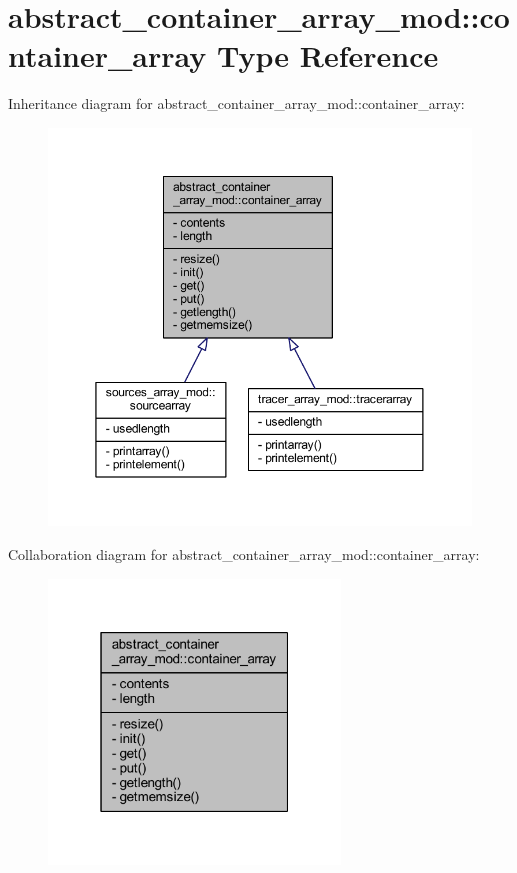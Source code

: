 \hypertarget{structabstract__container__array__mod_1_1container__array}{}\section{abstract\+\_\+container\+\_\+array\+\_\+mod\+:\+:container\+\_\+array Type Reference}
\label{structabstract__container__array__mod_1_1container__array}


Inheritance diagram for abstract\+\_\+container\+\_\+array\+\_\+mod\+:\+:container\+\_\+array\+:\nopagebreak
\begin{figure}[H]
\begin{center}
\leavevmode
\includegraphics[width=350pt]{structabstract__container__array__mod_1_1container__array__inherit__graph}
\end{center}
\end{figure}


Collaboration diagram for abstract\+\_\+container\+\_\+array\+\_\+mod\+:\+:container\+\_\+array\+:\nopagebreak
\begin{figure}[H]
\begin{center}
\leavevmode
\includegraphics[width=220pt]{structabstract__container__array__mod_1_1container__array__coll__graph}
\end{center}
\end{figure}
